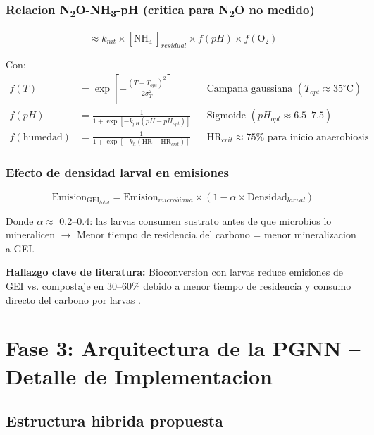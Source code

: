 \documentclass[12pt]{article}
\begin{document}
\subsubsection{Relacion N\textsubscript{2}O-NH\textsubscript{3}-pH (critica para N\textsubscript{2}O no medido)}

\begin{equation}
[\text{N}_2\text{O}] \approx k_{nit} \times [\text{NH}_4^+]_{residual} \times f(pH) \times f(\text{O}_2)
\end{equation}

Con:
\begin{align*}
f(T) &= \exp\left[-\frac{(T - T_{opt})^2}{2\sigma_T^2}\right] && \text{Campana gaussiana } (T_{opt} \approx 35^\circ\text{C}) \\
f(pH) &= \frac{1}{1 + \exp[-k_{pH}(pH - pH_{opt})]} && \text{Sigmoide } (pH_{opt} \approx 6.5\text{--}7.5) \\
f(\text{humedad}) &= \frac{1}{1 + \exp[-k_h(\text{HR} - \text{HR}_{crit})]} && \text{HR}_{crit} \approx 75\% \text{ para inicio anaerobiosis}
\end{align*}

\subsubsection{Efecto de densidad larval en emisiones}

\begin{equation}
\text{Emision}_{\text{GEI}_{total}} = \text{Emision}_{microbiana} \times (1 - \alpha \times \text{Densidad}_{larval})
\end{equation}

Donde $\alpha \approx$ 0.2--0.4: las larvas consumen sustrato antes de que microbios lo mineralicen $\rightarrow$ Menor tiempo de residencia del carbono = menor mineralizacion a GEI.

\noindent\textbf{Hallazgo clave de literatura:} Bioconversion con larvas reduce emisiones de GEI vs. compostaje en 30--60\% debido a menor tiempo de residencia y consumo directo del carbono por larvas \cite{ref56,ref64}.

\newpage

\section{Fase 3: Arquitectura de la PGNN -- Detalle de Implementacion}

\subsection{Estructura hibrida propuesta}
\end{document}
